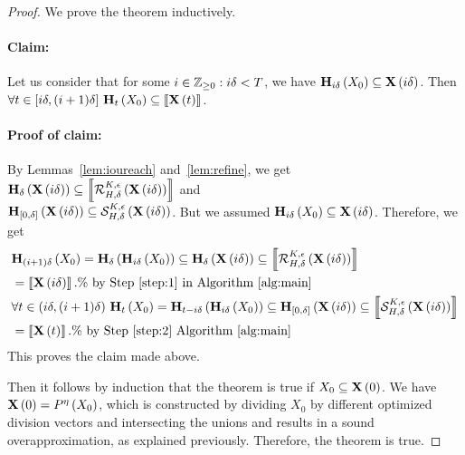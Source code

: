 \begin{proof}
We prove the theorem inductively.

\paragraph{Claim:}  Let us consider that for some
$i\in\mathbb{Z}_{\geq 0}:i\delta<T$, we have
$\mathbf{H}_{i\delta}\left(X_0\right)\subseteq\mathbf{X}\left(i\delta\right)$.  Then $\forall
t\in[i\delta,(i+1)\delta]~\mathbf{H}_{t}\left(X_0\right)\subseteq \left\llbracket{\mathbf{X}\left(t\right)}\right\rrbracket$.

\paragraph{Proof of claim:}
By Lemmas~\ref{lem:ioureach} and~\ref{lem:refine}, we get
$\mathbf{H}_{\delta}\left(\mathbf{X}\left(i\delta\right)\right)\subseteq \left\llbracket{\mathcal{R}_{H,\delta}^{K,\epsilon}\left(\mathbf{X}\left(i\delta\right)\right)}\right\rrbracket$
and\\
$\mathbf{H}_{[0,\delta]}\left(\mathbf{X}\left(i\delta\right)\right)\subseteq \mathcal{S}_{H,\delta}^{K,\epsilon}\left(\mathbf{X}\left(i\delta\right)\right)$.
But we assumed $\mathbf{H}_{i\delta}\left(X_0\right)\subseteq \mathbf{X}\left(i\delta\right)$.
Therefore, we get
%
\begin{align*}
& \reach{H}{(i+1)\delta}{X_0}
= \reach{H}{\delta}{\reach{H}{i\delta}{X_0}} \subseteq \reach{H}{\delta}{\tr{X}{i\delta}}
\subseteq \ztset{\flow{H}{\delta}{K}{\epsilon}{\tr{X}{i\delta}}}\\
& = \ztset{\tr{X}{i\delta}}.\%~\text{by Step~\ref{step:1} in Algorithm~\ref{alg:main}}\\
%
& \forall t\in(i\delta,(i+1)\delta)~\reach{H}{t}{X_0}
= \reach{H}{t-i\delta}{\reach{H}{i\delta}{X_0}} \subseteq \reach{H}{[0,\delta]}{\tr{X}{i\delta}}
\subseteq \ztset{\ivflow{H}{\delta}{K}{\epsilon}{\tr{X}{i\delta}}}\\
& = \ztset{\tr{X}{t}}. \%~\text{by Step~\ref{step:2} Algorithm~\ref{alg:main}}
\end{align*}
%
This proves the claim made above.

Then it follows by induction that the theorem is true if
$X_0\subseteq \mathbf{X}\left(0\right)$.  We have $\mathbf{X}\left(0\right) = P^{\eta}\left(X_0\right)$,
which is constructed by dividing $X_0$ by different optimized division
vectors and intersecting the unions and results in a sound
overapproximation, as explained previously.  Therefore, the theorem is
true.
\end{proof}
%
